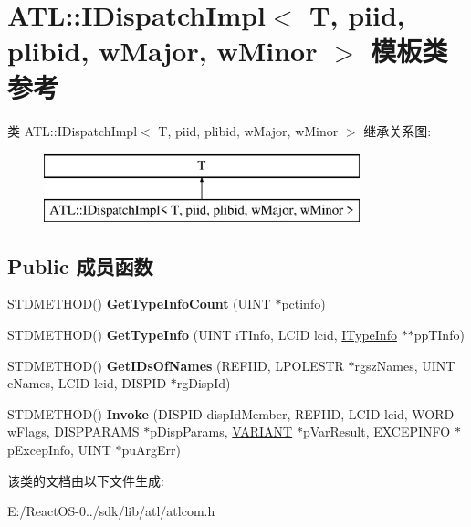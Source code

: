 \hypertarget{class_a_t_l_1_1_i_dispatch_impl}{}\section{A\+TL\+:\+:I\+Dispatch\+Impl$<$ T, piid, plibid, w\+Major, w\+Minor $>$ 模板类 参考}
\label{class_a_t_l_1_1_i_dispatch_impl}
类 A\+TL\+:\+:I\+Dispatch\+Impl$<$ T, piid, plibid, w\+Major, w\+Minor $>$ 继承关系图\+:\begin{figure}[H]
\begin{center}
\leavevmode
\includegraphics[height=2.000000cm]{class_a_t_l_1_1_i_dispatch_impl}
\end{center}
\end{figure}
\subsection*{Public 成员函数}
\begin{DoxyCompactItemize}
\item 
\mbox{\label{class_a_t_l_1_1_i_dispatch_impl_a166a204b0823cd6eecd9e2ed34e999f3}} 
S\+T\+D\+M\+E\+T\+H\+OD() {\bfseries Get\+Type\+Info\+Count} (U\+I\+NT $\ast$pctinfo)
\item 
\mbox{\label{class_a_t_l_1_1_i_dispatch_impl_ac7a7a13e2ef39b73dfdbc5f7ec531d6a}} 
S\+T\+D\+M\+E\+T\+H\+OD() {\bfseries Get\+Type\+Info} (U\+I\+NT i\+T\+Info, L\+C\+ID lcid, \hyperlink{interface_i_type_info}{I\+Type\+Info} $\ast$$\ast$pp\+T\+Info)
\item 
\mbox{\label{class_a_t_l_1_1_i_dispatch_impl_ae9246ccad5a77470d910240b214b41f3}} 
S\+T\+D\+M\+E\+T\+H\+OD() {\bfseries Get\+I\+Ds\+Of\+Names} (R\+E\+F\+I\+ID, L\+P\+O\+L\+E\+S\+TR $\ast$rgsz\+Names, U\+I\+NT c\+Names, L\+C\+ID lcid, D\+I\+S\+P\+ID $\ast$rg\+Disp\+Id)
\item 
\mbox{\label{class_a_t_l_1_1_i_dispatch_impl_a67449d83be86e52f0764373a2d02fc0f}} 
S\+T\+D\+M\+E\+T\+H\+OD() {\bfseries Invoke} (D\+I\+S\+P\+ID disp\+Id\+Member, R\+E\+F\+I\+ID, L\+C\+ID lcid, W\+O\+RD w\+Flags, D\+I\+S\+P\+P\+A\+R\+A\+MS $\ast$p\+Disp\+Params, \hyperlink{structtag_v_a_r_i_a_n_t}{V\+A\+R\+I\+A\+NT} $\ast$p\+Var\+Result, E\+X\+C\+E\+P\+I\+N\+FO $\ast$p\+Excep\+Info, U\+I\+NT $\ast$pu\+Arg\+Err)
\end{DoxyCompactItemize}


该类的文档由以下文件生成\+:\begin{DoxyCompactItemize}
\item 
E\+:/\+React\+O\+S-\/0../sdk/lib/atl/atlcom.\+h\end{DoxyCompactItemize}
